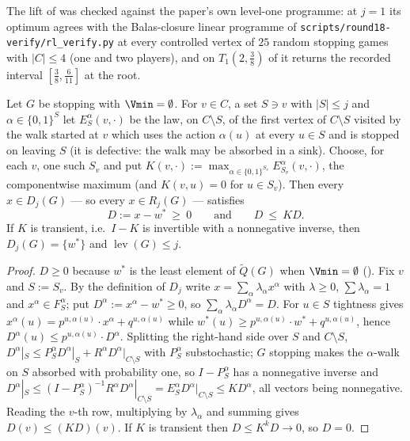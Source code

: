 \begin{remark}\label{xc:lift-verified}
The lift of  was checked against the paper's own level-one programme: at
$j=1$ its optimum agrees with the Balas-closure linear programme of
\texttt{scripts/round18-verify/rl\_verify.py} at every controlled vertex of $25$ random stopping
games with $|C|\le4$ (one and two players), and on $T_1(2,\tfrac38)$ of
 it returns the recorded interval $[\tfrac38,\tfrac6{11}]$ at the root.
\end{remark}

\begin{theorem}\label{xc:exit}
Let $G$ be stopping with $\Vmin=\emptyset$.  For $v\in C$, a set $S\ni v$ with $|S|\le j$ and
$\alpha\in\{0,1\}^{S}$ let $E^{\alpha}_{S}(v,\cdot)$ be the law, on $C\setminus S$, of the first
vertex of $C\setminus S$ visited by the walk started at $v$ which uses the action $\alpha(u)$ at
every $u\in S$ and is stopped on leaving $S$ (it is defective: the walk may be absorbed in a
sink).  Choose, for each $v$, one such $S_v$ and put
$K(v,\cdot):=\max_{\alpha\in\{0,1\}^{S_v}}E^{\alpha}_{S_v}(v,\cdot)$, the componentwise maximum
(and $K(v,u)=0$ for $u\in S_v$).  Then every $x\in D_j(G)$ --- so every $x\in R_j(G)$ ---
satisfies
\[
   D:=x-w^{\ast}\ \ge\ 0\qquad\text{and}\qquad D\ \le\ KD .
\]
If $K$ is transient, i.e.\ $I-K$ is invertible with a nonnegative inverse, then
$D_j(G)=\{w^{\ast}\}$ and $\operatorname{lev}(G)\le j$.
\end{theorem}

\begin{proof}
$D\ge0$ because $w^{\ast}$ is the least element of $\widetilde Q(G)$ when $\Vmin=\emptyset$
().  Fix $v$ and $S:=S_v$.  By the definition of $D_j$ write
$x=\sum_{\alpha}\lambda_\alpha x^{\alpha}$ with $\lambda\ge0$, $\sum\lambda_\alpha=1$ and
$x^{\alpha}\in F^{\alpha}_{S}$; put $D^{\alpha}:=x^{\alpha}-w^{\ast}\ge0$, so
$\sum_\alpha\lambda_\alpha D^{\alpha}=D$.  For $u\in S$ tightness gives
$x^{\alpha}(u)=p^{u,\alpha(u)}\!\cdot\!x^{\alpha}+q^{u,\alpha(u)}$ while
$w^{\ast}(u)\ge p^{u,\alpha(u)}\!\cdot\!w^{\ast}+q^{u,\alpha(u)}$, hence
$D^{\alpha}(u)\le p^{u,\alpha(u)}\!\cdot\!D^{\alpha}$.  Splitting the right-hand side over $S$
and $C\setminus S$, $D^{\alpha}|_{S}\le P^{\alpha}_{S}D^{\alpha}|_{S}+R^{\alpha}
D^{\alpha}|_{C\setminus S}$ with $P^{\alpha}_{S}$ substochastic; $G$ stopping makes the
$\alpha$-walk on $S$ absorbed with probability one, so $I-P^{\alpha}_{S}$ has a nonnegative
inverse and $D^{\alpha}|_{S}\le(I-P^{\alpha}_{S})^{-1}R^{\alpha}D^{\alpha}|_{C\setminus S}
=E^{\alpha}_{S}D^{\alpha}|_{C\setminus S}\le KD^{\alpha}$, all vectors being nonnegative.
Reading the $v$-th row, multiplying by $\lambda_\alpha$ and summing gives $D(v)\le(KD)(v)$.  If
$K$ is transient then $D\le K^{k}D\to0$, so $D=0$.
\end{proof}

